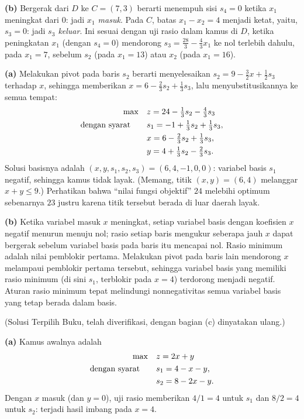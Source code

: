 \textbf{(b)} Bergerak dari $D$ ke $C = (7, 3)$ berarti menempuh sisi
$s_4 = 0$ ketika $x_1$ meningkat dari $0$: jadi \emph{$x_1$ masuk}. Pada $C$,
batas $x_1 - x_2 = 4$ menjadi ketat, yaitu, $s_3 = 0$: jadi
\emph{$s_3$ keluar}. Ini sesuai dengan uji rasio dalam kamus di
$D$, ketika peningkatan $x_1$ (dengan $s_4 = 0$) mendorong
$s_3 = \tfrac{28}{3} - \tfrac43 x_1$ ke nol terlebih dahulu, pada $x_1 = 7$,
sebelum $s_2$ (pada $x_1 = 13$) atau $x_2$ (pada $x_1 = 16$).


\textbf{(a)} Melakukan pivot pada baris $s_2$ berarti menyelesaikan
$s_2 = 9 - \tfrac32 x + \tfrac12 s_3$ terhadap $x$, sehingga memberikan
$x = 6 - \tfrac23 s_2 + \tfrac13 s_3$, lalu menyubstitusikannya ke semua tempat:
\[
\begin{aligned}
\max\quad & z = 24 - \tfrac13 s_2 - \tfrac43 s_3 \\
\mbox{dengan syarat}\quad\quad & s_1 = -1 + \tfrac13 s_2 + \tfrac13 s_3, \\
& x = 6 - \tfrac23 s_2 + \tfrac13 s_3, \\
& y = 4 + \tfrac13 s_2 - \tfrac23 s_3.
\end{aligned}
\]
Solusi basisnya adalah $(x, y, s_1, s_2, s_3) = (6, 4, -1, 0, 0)$: variabel
basis $s_1$ negatif, sehingga kamus tidak layak. (Memang,
titik $(x, y) = (6, 4)$ melanggar $x + y \leq 9$.) Perhatikan bahwa
``nilai fungsi objektif'' $24$ melebihi optimum sebenarnya $23$ justru karena
titik tersebut berada di luar daerah layak.

\textbf{(b)} Ketika variabel masuk $x$ meningkat, setiap variabel basis
dengan koefisien $x$ negatif menurun menuju nol; rasio setiap
baris mengukur seberapa jauh $x$ dapat bergerak sebelum variabel basis pada baris itu mencapai
nol. Rasio minimum adalah nilai pemblokir pertama. Melakukan pivot pada
baris lain mendorong $x$ melampaui pemblokir pertama tersebut, sehingga variabel basis yang
memiliki rasio minimum (di sini $s_1$, terblokir pada $x = 4$) terdorong
menjadi negatif. Aturan rasio minimum tepat melindungi nonnegativitas
semua variabel basis yang tetap berada dalam basis.


(Solusi Terpilih Buku, telah diverifikasi, dengan bagian (c) dinyatakan ulang.)

\textbf{(a)} Kamus awalnya adalah
\[
\begin{aligned}
\max\quad & z = 2x + y \\
\mbox{dengan syarat}\quad\quad & s_1 = 4 - x - y, \\
& s_2 = 8 - 2x - y.
\end{aligned}
\]
Dengan $x$ masuk (dan $y = 0$), uji rasio memberikan $4/1 = 4$ untuk $s_1$
dan $8/2 = 4$ untuk $s_2$: terjadi hasil imbang pada $x = 4$.

